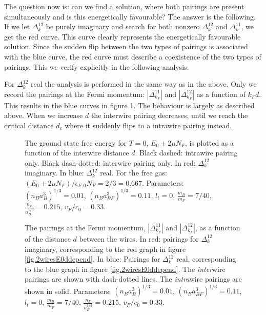 The question now is: can we find a solution, where both pairings are present simultaneously and is this energetically favourable? The answer is the following. If we let $\Delta^{12}_k$ be purely imaginary and search for both nonzero $\Delta^{12}_k$ and $\Delta^{11}_k$, we get the red curve. This curve clearly represents the energetically favourable solution. Since the sudden flip between the two types of pairings is associated with the blue curve, the red curve must describe a coexistence of the two types of pairings. This we verify explicitly in the following analysis. 

For $\Delta^{12}_k$ real the analysis is performed in the same way as in the above. Only we record the pairings at the Fermi momentum: $\left|\Delta^{11}_{k_F}\right|$ and $\left|\Delta^{12}_{k_F}\right|$ as a function of $k_Fd$. This results in the blue curves in figure \ref{fig.2wiresMaximalPairingddepend}. The behaviour is largely as described above. When we increase $d$ the interwire pairing decreases, until we reach the critical distance $d_c$ where it suddenly flips to a intrawire pairing instead. 

\begin{figure} 
\begin{center}  
  
\caption{The ground state free energy for $T = 0$, $E_0 + 2\mu N_F$, is plotted as a function of the interwire distance $d$. Black dashed: intrawire pairing only. Black dash-dotted: interwire pairing only. In red: $\Delta^{12}_k$ imaginary. In blue: $\Delta^{12}_k$ real. For the free gas: $(E_0 + 2\mu N_F)/\epsilon_{F,0}N_F = 2/3 = 0.667$. Parameters: $(n_Ba_B^3)^{1/3} = 0.01$, $(n_Ba_{BF}^3)^{1/3} = 0.11$, $l_t = 0$, $\frac{m_B}{m_F} = 7/40$, $\frac{n_F}{n_B^{1/3}} = 0.215$, $v_F/c_0 = 0.33$. }  
\label{fig.2wiresE0ddepend}  
\vspace{0.5cm}
  
\caption{The pairings at the Fermi momentum, $\left|\Delta^{11}_{k_F}\right|$ and $\left|\Delta^{12}_{k_F}\right|$, as a function of the distance $d$ between the wires. In red: pairings for $\Delta^{12}_k$ imaginary, corresponding to the red graph in figure \ref{fig.2wiresE0ddepend}. In blue: Pairings for $\Delta^{12}_k$ real, corresponding to the blue graph in figure \ref{fig.2wiresE0ddepend}. The \textit{inter}wire pairings are shown with dash-dotted lines. The \textit{intra}wire pairings are shown in solid. Parameters: $(n_Ba_B^3)^{1/3} = 0.01$, $(n_Ba_{BF}^3)^{1/3} = 0.11$, $l_t = 0$, $\frac{m_B}{m_F} = 7/40$, $\frac{n_F}{n_B^{1/3}} = 0.215$, $v_F/c_0 = 0.33$. }
\label{fig.2wiresMaximalPairingddepend}
\end{center}
\end{figure}

